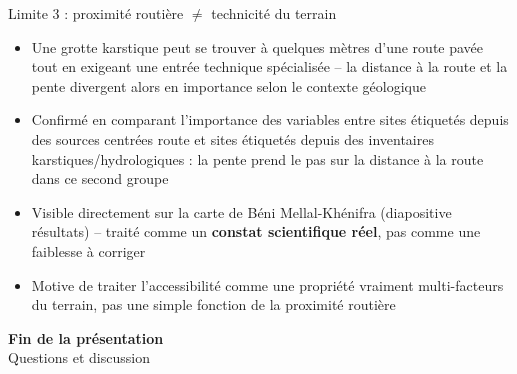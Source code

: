 \documentclass[11pt,aspectratio=169]{beamer}
\begin{document}
\begin{frame}{Limite 3 : proximit\'e routi\`ere $\ne$ technicit\'e du terrain}
  \begin{itemize}
    \setlength\itemsep{0.9em}
    \item Une grotte karstique peut se trouver \`a quelques m\`etres d'une route pav\'ee
      tout en exigeant une entr\'ee technique sp\'ecialis\'ee -- la distance \`a la route
      et la pente divergent alors en importance selon le contexte g\'eologique
    \item Confirm\'e en comparant l'importance des variables entre sites \'etiquet\'es
      depuis des sources centr\'ees route et sites \'etiquet\'es depuis des inventaires
      karstiques/hydrologiques : la pente prend le pas sur la distance \`a la route dans
      ce second groupe
    \item Visible directement sur la carte de B\'eni Mellal-Kh\'enifra (diapositive
      r\'esultats) -- trait\'e comme un \textbf{constat scientifique r\'eel}, pas comme
      une faiblesse \`a corriger
    \item Motive de traiter l'accessibilit\'e comme une propri\'et\'e vraiment
      multi-facteurs du terrain, pas une simple fonction de la proximit\'e routi\`ere
  \end{itemize}
\end{frame}

{
\begin{frame}[plain]
  \centering
  \vspace{2cm}
  {\Large\bfseries\color{accent} Fin de la pr\'esentation}\\[0.4cm]
  {\normalsize\color{graytext} Questions et discussion}
\end{frame}
}
\end{document}
